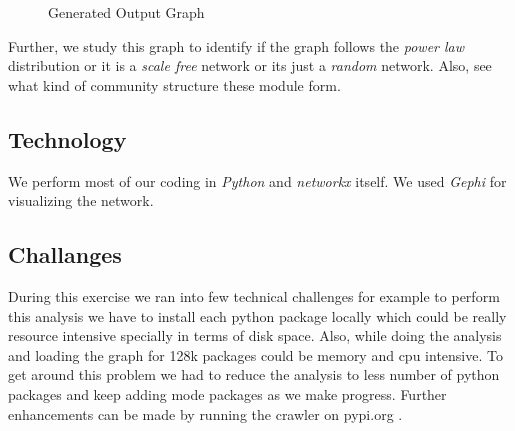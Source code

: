 \begin{figure}[htbp]
\centering
{}
\caption{Generated Output Graph}
\label{fig:gengraph}
\end{figure}
 
 Further, we study this graph to identify if the graph 
 follows the \textit{power law} distribution or it is a \textit{scale free} 
 network or its just a \textit{random} network. Also, see what kind of 
 community structure these module form.
 
\subsection{Technology} \label{tech}
We perform most of our coding in \textit{Python} and \textit{networkx} itself. 
We used \textit{Gephi} for visualizing the network.

\subsection{Challanges} \label{techchallanges}
During this exercise we ran into few technical challenges for example
to perform this analysis we have to install each python package locally
which could be really resource intensive specially in terms of disk space.
Also, while doing the analysis and loading the graph for 128k packages
could be memory and cpu intensive. To get around this problem we 
had to reduce the analysis to less number of python packages and keep
adding mode packages as we make progress. Further enhancements can be made
by running the crawler on pypi.org \cite{www-pypi}.